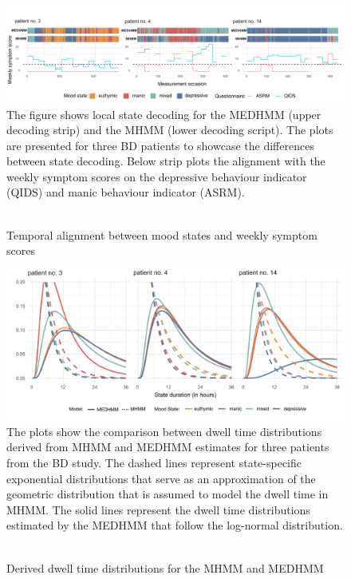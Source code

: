 \begin{figure}
\caption{\\Temporal alignment between mood states and weekly symptom scores}
    \centering
    \includegraphics[width=1\linewidth]{graphics/decoding_14.pdf}
    \flushleft
    \footnotesize
    \justifying
    The figure shows local state decoding for the MEDHMM (upper decoding strip) and the MHMM (lower decoding script). The plots are presented for three BD patients to showcase the differences between state decoding. Below strip plots the alignment with the weekly symptom scores on the depressive behaviour indicator (QIDS) and manic behaviour indicator (ASRM).
    \label{quest_vs_decoding}
\end{figure}

\begin{figure}
\caption{\\Derived dwell time distributions for the MHMM and MEDHMM}
    \centering
    \includegraphics[width=1\linewidth]{graphics/expected_dwell_distr.pdf}
    \flushleft
    \footnotesize
    \justifying
    The plots show the comparison between dwell time distributions derived from MHMM and MEDHMM estimates for three patients from the BD study. The dashed lines represent state-specific exponential distributions that serve as an approximation of the geometric distribution that is assumed to model the dwell time in MHMM. The solid lines represent the dwell time distributions estimated by the MEDHMM that follow the log-normal distribution.
    \label{exp_ss_dwell}
\end{figure}

